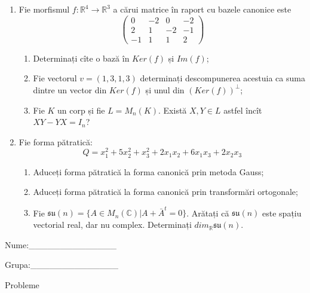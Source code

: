\documentclass{article}
\begin{document}
\begin{enumerate}
 \item Fie morfismul $f:\mathbb{R}^4 \to \mathbb{R}^3$ a cărui matrice în raport cu bazele canonice este
$$\begin{pmatrix}
0&-2&0&-2\\
2&1&-2&-1\\
-1&1&1&2
\end{pmatrix}$$

\begin{enumerate}
\item Determinați cîte o bază în $Ker(f)$ și $Im(f)$;
\item Fie vectorul $v=(1,3,1,3)$ determinați descompunerea acestuia ca suma dintre un vector din $Ker(f)$ și unul din $(Ker(f))^\perp$;
\item Fie $K$ un corp și fie $L=M_n(K)$. Există $X,Y \in L$ astfel încît $XY-YX=I_n$?  
\end{enumerate}
\item Fie forma pătratică:
$$Q= x_1^2+5x_2^2+x_3^2+2x_1x_2+6x_1x_3+2x_2x_3$$

\begin{enumerate}
\item Aduceți forma pătratică la forma canonică prin metoda Gauss;
\item Aduceți forma pătratică la forma canonică prin transformări ortogonale;
\item Fie $\mathfrak{su}(n)=\{ A \in M_n(\mathbb{C}) | A+\bar{A}^t=0\}$. Arătați că $\mathfrak{su}(n)$ este spațiu vectorial real, dar nu complex.
Determinați $dim_{\mathbb{R}}\mathfrak{su}(n)$.
\end{enumerate}
\end{enumerate}
\newpage
\begin{flushright}
Nume:\_\_\_\_\_\_\_\_\_\_\_\_\_\_
 
 
Grupa:\_\_\_\_\_\_\_\_\_\_\_\_\_\_
\end{flushright}
\begin{center}
\vspace{2cm}
{\Large Probleme}
\vspace{2cm}
\end{center}
\end{document}
